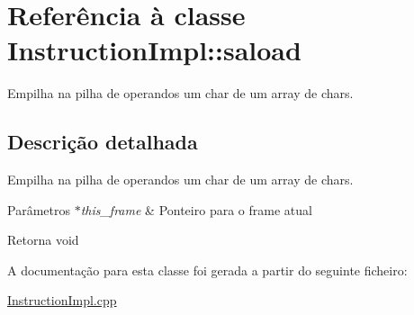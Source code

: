 \hypertarget{class_instruction_impl_1_1saload}{}\section{Referência à classe Instruction\+Impl\+:\+:saload}
\label{class_instruction_impl_1_1saload}


Empilha na pilha de operandos um char de um array de chars.  




\subsection{Descrição detalhada}
Empilha na pilha de operandos um char de um array de chars. 


\begin{DoxyParams}{Parâmetros}
{\em $\ast$this\+\_\+frame} & Ponteiro para o frame atual \\
\hline
\end{DoxyParams}
\begin{DoxyReturn}{Retorna}
void 
\end{DoxyReturn}


A documentação para esta classe foi gerada a partir do seguinte ficheiro\+:\begin{DoxyCompactItemize}
\item 
\hyperlink{_instruction_impl_8cpp}{Instruction\+Impl.\+cpp}\end{DoxyCompactItemize}
